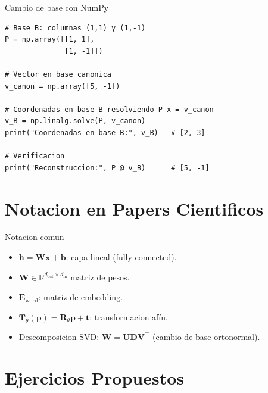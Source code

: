 \documentclass[aspectratio=169, 10pt, xcolor=table]{beamer}
\begin{document}
\begin{frame}[fragile]{Cambio de base con NumPy}
    \begin{lstlisting}
# Base B: columnas (1,1) y (1,-1)
P = np.array([[1, 1],
              [1, -1]])

# Vector en base canonica
v_canon = np.array([5, -1])

# Coordenadas en base B resolviendo P x = v_canon
v_B = np.linalg.solve(P, v_canon)
print("Coordenadas en base B:", v_B)   # [2, 3]

# Verificacion
print("Reconstruccion:", P @ v_B)      # [5, -1]
    \end{lstlisting}
\end{frame}

\section{Notacion en Papers Cientificos}

\begin{frame}{Notacion comun}
    \begin{itemize}
        \item $\mathbf{h} = \mathbf{W}\mathbf{x} + \mathbf{b}$: capa lineal (fully connected).
        \item $\mathbf{W} \in \mathbb{R}^{d_{\text{out}}\times d_{\text{in}}}$ matriz de pesos.
        \item $\mathbf{E}_{\text{word}}$: matriz de embedding.
        \item $\mathbf{T}_\theta(\mathbf{p}) = \mathbf{R}_\theta \mathbf{p} + \mathbf{t}$: transformacion afín.
        \item Descomposicion SVD: $\mathbf{W} = \mathbf{U}\mathbf{D}\mathbf{V}^\top$ (cambio de base ortonormal).
    \end{itemize}
\end{frame}

\section{Ejercicios Propuestos}
\end{document}
